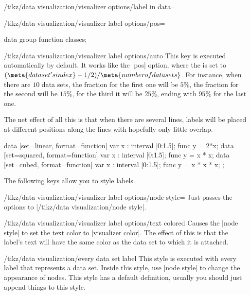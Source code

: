 \begin{key}{/tikz/data visualization/visualizer options/label in data=}
\begin{key}{/tikz/data visualization/visualizer label options/pos=}
\begin{codeexample}[width=6.3cm]
data group {function classes};
\end{codeexample}
  \end{key}
  \begin{key}{/tikz/data visualization/visualizer label options/auto}
    This key is executed automatically by default. It works like the
    |pos| option, where the  is set to $(\meta{data set's
      index}-1/2)/\meta{number of data sets}$. For instance, when
    there are $10$ data sets, the fraction for the first one will be
    $5\%$, the fraction for the second will be $15\%$, for the third
    it will be $25\%$, ending with $95\%$ for the last one.

    The net effect of all this is that when there are several lines,
    labels will be placed at different positions along the lines with
    hopefully only little overlap.
\begin{codeexample}[width=6.3cm]
\tikz \datavisualization [
  scientific clean axes, scientific axes/height=7cm, scientific axes/width=13cm,
  visualize as smooth line/.list={linear, squared, cubed},
  linear ={label in data={text=$2x$}},
  squared={label in data={text=$x^2$}},
  cubed  ={label in data={text=$x^3$}}]
data [set=linear, format=function] {
  var x : interval [0:1.5];
  func y = 2*\value x;
}
data [set=squared, format=function] {
  var x : interval [0:1.5];
  func y = \value x * \value x;
}
data [set=cubed, format=function] {
  var x : interval [0:1.5];
  func y = \value x * \value x * \value x;
};
\end{codeexample}
  \end{key}
  
  The following keys allow you to style labels.

  \begin{key}{/tikz/data visualization/visualizer label
      options/node style=}
    Just passes the options to |/tikz/data visualization/node style|.
  \end{key}
  \begin{key}{/tikz/data visualization/visualizer label
      options/text colored}
    Causes the |node style| to set the text color to
    |visualizer color|. The effect of this is that the label's text
    will have the same color as the data set to which it is attached.
  \end{key}
  
  \begin{stylekey}{/tikz/data visualization/every data set label}
    This style is executed with every label that represents a
    data set. Inside this style, use |node style| to change the
    appearance of nodes. This style has a default definition, usually
    you should just append things to this style.


\end{stylekey}
\end{key}
